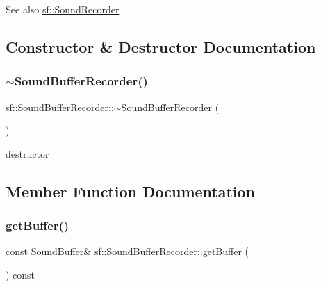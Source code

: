 \begin{DoxySeeAlso}{See also}
\mbox{\hyperlink{classsf_1_1_sound_recorder}{sf\+::\+Sound\+Recorder}} \begin{DoxyVerb}\end{DoxyVerb}
 
\end{DoxySeeAlso}


\subsection{Constructor \& Destructor Documentation}
\mbox{\label{classsf_1_1_sound_buffer_recorder_a350f7f885ccfd12b4c6c120c23695637}} 
\subsubsection{\texorpdfstring{$\sim$SoundBufferRecorder()}{~SoundBufferRecorder()}}
{\footnotesize\ttfamily sf\+::\+Sound\+Buffer\+Recorder\+::$\sim$\+Sound\+Buffer\+Recorder (\begin{DoxyParamCaption}{ }\end{DoxyParamCaption})}



destructor 

\begin{DoxyVerb}\end{DoxyVerb}
 

\subsection{Member Function Documentation}
\mbox{\label{classsf_1_1_sound_buffer_recorder_aa3a8d7a612cb885ed2f58bb86aa24acb}} 
\subsubsection{\texorpdfstring{getBuffer()}{getBuffer()}}
{\footnotesize\ttfamily const \mbox{\hyperlink{classsf_1_1_sound_buffer}{Sound\+Buffer}}\& sf\+::\+Sound\+Buffer\+Recorder\+::get\+Buffer (\begin{DoxyParamCaption}{ }\end{DoxyParamCaption}) const}



